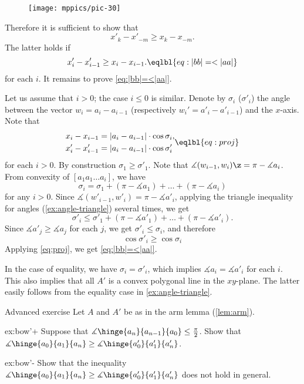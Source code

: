 \begin{wrapfigure}{r}{60mm}
\vskip-5mm
\centering
\texttt{[image: mppics/pic-30]}
\vskip3mm
\end{wrapfigure}

Therefore it is sufficient to show
that 
$$x'_k-x'_{-m}\ge x_k-x_{-m}.$$
The latter holds if
$$x'_i-x'_{i-1}\ge x_i-x_{i-1}.\eqlbl{eq:|bb|=<|aa|}$$
for each $i$.
It remains to prove \ref{eq:|bb|=<|aa|}.

Let us assume that $i>0$; 
the case $i\le 0$ is similar.
Denote by $\sigma_i$ ($\sigma'_i$) the angle between the vector $w_i=a_{i}-a_{i-1}$ (respectively $w_i'=a'_{i}-a'_{i-1}$) and the $x$-axis.
Note that
$$\begin{aligned}
x_i-x_{i-1}&=|a_i-a_{i-1}|\cdot\cos\sigma_i,
\\
x'_i-x'_{i-1}&=|a_i-a_{i-1}|\cdot\cos\sigma'_i
\end{aligned}
\eqlbl{eq:proj}$$
for each $i>0$.
By construction $\sigma_1\ge \sigma'_1$.
Note that $\measuredangle (w_{i-1},w_i)\z=\pi -\measuredangle a_i$.
From convexity of $[a_1 a_1\dots a_i]$, we have
$$\sigma_i=\sigma_1+(\pi-\measuredangle a_1)+\dots+(\pi-\measuredangle a_i)$$
 for any $i>0$.
Since $\measuredangle (w'_{i-1},w'_i)=\pi -\measuredangle a'_i$,
applying the triangle inequality for angles (\ref{ex:angle-triangle}) several times,
we get
$$\sigma'_i\le\sigma'_1+(\pi-\measuredangle a'_1)+\dots+(\pi-\measuredangle a'_i).$$
Since $\measuredangle a'_j\ge \measuredangle a_j$ for each $j$, we get
$\sigma'_i\le \sigma_i$, and therefore
\[\cos \sigma'_i\ge \cos\sigma_i\]
Applying \ref{eq:proj}, we get \ref{eq:|bb|=<|aa|}.

In the case of equality, we have $\sigma_i=\sigma'_i$,
which implies $\measuredangle a_i=\measuredangle a'_i$ for each $i$.
This also implies that all $A'$ is a convex polygonal line in the $xy$-plane.
The latter easily follows from the equality case in \ref{ex:angle-triangle}.
\qeds

\begin{thm}{Advanced exercise}\label{ex:arm'}
Let $A$ and $A'$ be as in the arm lemma (\ref{lem:arm}).

\begin{subthm}{ex:bow'+}
Suppose that $\measuredangle \hinge{a_n}{a_{n-1}}{a_0}\le\tfrac\pi2$.
Show that $\measuredangle \hinge{a_0}{a_1}{a_n}\ge \measuredangle \hinge{a_0'}{a_1'}{a_n'}$.
\end{subthm}

\begin{subthm}{ex:bow'-} Show that the inequality $\measuredangle \hinge{a_0}{a_1}{a_n}\ge \measuredangle \hinge{a_0'}{a_1'}{a_n'}$ does not hold in general.
\end{subthm}

\end{thm}


